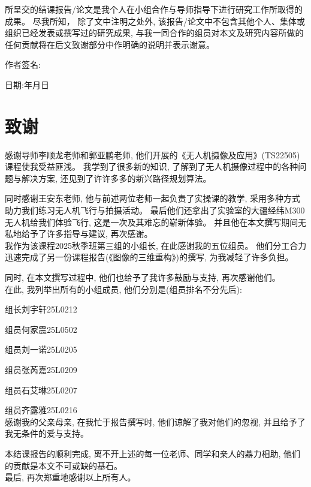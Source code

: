 \documentclass[12pt,a4paper,oneside,UTF8]{ctexart}
\begin{document}
所呈交的结课报告/论文是我个人在小组合作与导师指导下进行研究工作所取得的成果。
尽我所知，
除了文中注明之处外,
该报告/论文中不包含其他个人、集体或组织已经发表或撰写过的研究成果,
与我一同合作的组员对本文及研究内容所做的任何贡献将在后文致谢部分中作明确的说明并表示谢意。

作者签名:

日期:\qquad 年\qquad 月\qquad 日
\newpage\section{致谢}
感谢导师李顺龙老师和郭亚鹏老师,
他们开展的《无人机摄像及应用》(TS22505)课程使我受益匪浅。
我学到了很多新的知识,
了解到了无人机摄像过程中的各种问题与解决方案,
还见到了许许多多的新兴路径规划算法。

同时感谢王安东老师,
他与前述两位老师一起负责了实操课的教学,
采用多种方式助力我们练习无人机飞行与拍摄活动。
最后他们还拿出了实验室的大疆经纬M300无人机给我们体验飞行,
这是一次及其难忘的崭新体验。
并且他在本文撰写期间无私地给予了许多指导与建议,
再次感谢。
~\\

我作为该课程2025秋季班第三组的小组长,
在此感谢我的五位组员。
他们分工合力迅速完成了另一份课程报告(《图像的三维重构》)的撰写,
为我减轻了许多负担。

同时,
在本文撰写过程中,
他们也给予了我许多鼓励与支持,
再次感谢他们。
~\\

在此,
我列举出所有的小组成员,
他们分别是(组员排名不分先后):

\qquad 组长\quad 刘宇轩\quad 25L0212

\qquad 组员\quad 何家震\quad 25L0502

\qquad 组员\quad 刘一诺\quad 25L0205

\qquad 组员\quad 张芮嘉\quad 25L0209

\qquad 组员\quad 石艾琳\quad 25L0207

\qquad 组员\quad 齐露雅\quad 25L0216
~\\

感谢我的父亲母亲,
在我忙于报告撰写时,
他们谅解了我对他们的忽视,
并且给予了我无条件的爱与支持。

本结课报告的顺利完成,
离不开上述的每一位老师、同学和亲人的鼎力相助,
他们的贡献是本文不可或缺的基石。
~\\

最后,
再次郑重地感谢以上所有人。
\end{document}
